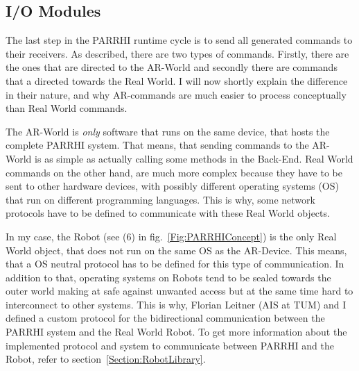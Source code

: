 \subsection{I/O Modules}

The last step in the PARRHI runtime cycle is to send all generated commands to their receivers. As described, there are two types of commands. Firstly, there are the ones that are directed to the AR-World and secondly there are commands that a directed towards the Real World. I will now shortly explain the difference in their nature, and why AR-commands are much easier to process conceptually than Real World commands.

The AR-World is \textit{only} software that runs on the same device, that hosts the complete PARRHI system. That means, that sending commands to the AR-World is as simple as actually calling some methods in the Back-End. Real World commands on the other hand, are much more complex because they have to be sent to other hardware devices, with possibly different operating systems (OS) that run on different programming languages. This is why, some network protocols have to be defined to communicate with these Real World objects. 

In my case, the Robot (see (6) in fig.~\ref{Fig:PARRHIConcept}) is the only Real World object, that does not run on the same OS as the AR-Device. This means, that a OS neutral protocol has to be defined for this type of communication. In addition to that, operating systems on Robots tend to be sealed towards the outer world making at safe against unwanted access but at the same time hard to interconnect to other systems. This is why, Florian Leitner (AIS at TUM) and I defined a custom protocol for the bidirectional communication between the PARRHI system and the Real World Robot. To get more information about the implemented protocol and system to communicate between PARRHI and the Robot, refer to section~\ref{Section:RobotLibrary}.


























